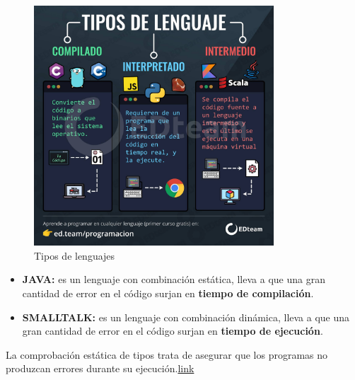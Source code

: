 \documentclass[../main.tex]{subfiles}
\begin{document}
        \begin{figure}[h]
            \centering
            \includegraphics[width=0.8\textwidth]{../images/lenguajes.jpeg}
            \caption{Tipos de lenguajes}
            \label{fig:tipos_lenguajes}
        \end{figure}

        \begin{itemize}
            \item \textbf{JAVA:} es un lenguaje con combinación estática, lleva a que una gran cantidad de error en el código surjan en \textbf{tiempo de compilación}.
            \item \textbf{SMALLTALK:} es un lenguaje con combinación dinámica, lleva a que una gran cantidad de error en el código surjan en \textbf{tiempo de ejecución}.
        \end{itemize}

        La comprobación estática de tipos trata de asegurar que los programas no produzcan errores durante su ejecución.\href{https://babel.ls.fi.upm.es/prole2013/miguel_garcia_rodriguez.pdf}{link}
\end{document}
